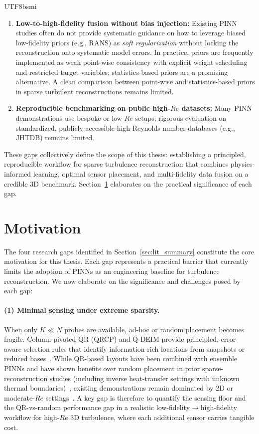 \documentclass[master]{NTHUthesis}
\begin{document}
\begin{CJK*}{UTF8}{bsmi}
\begin{enumerate}
    \item \textbf{Low-to-high-fidelity fusion without bias injection:} Existing PINN studies often do not provide systematic guidance on how to leverage biased low-fidelity priors (e.g., RANS) as \emph{soft regularization} without locking the reconstruction onto systematic model errors. In practice, priors are frequently implemented as weak point-wise consistency with explicit weight scheduling and restricted target variables; statistics-based priors are a promising alternative. A clean comparison between point-wise and statistics-based priors in sparse turbulent reconstructions remains limited.
    
    \item \textbf{Reproducible benchmarking on public high-$Re$ datasets:} Many PINN demonstrations use bespoke or low-$Re$ setups; rigorous evaluation on standardized, publicly accessible high-Reynolds-number databases (e.g., JHTDB) remains limited.
\end{enumerate}

These gaps collectively define the scope of this thesis: establishing a principled, reproducible workflow for sparse turbulence reconstruction that combines physics-informed learning, optimal sensor placement, and multi-fidelity data fusion on a credible 3D benchmark. Section~\ref{sec:motivation} elaborates on the practical significance of each gap.

\section{Motivation}
\label{sec:motivation}
The four research gaps identified in Section~\ref{sec:lit_summary} constitute the core motivation for this thesis. Each gap represents a practical barrier that currently limits the adoption of PINNs as an engineering baseline for turbulence reconstruction. We now elaborate on the significance and challenges posed by each gap:

\paragraph{(1) Minimal sensing under extreme sparsity.}
When only $K\!\ll\!N$ probes are available, ad-hoc or random placement becomes fragile. Column-pivoted QR (QRCP) and Q-DEIM provide principled, error-aware selection rules that identify information-rich locations from snapshots or reduced bases~\cite{Drmac2016SISC, Manohar2018PNAS}. While QR-based layouts have been combined with ensemble PINNs and have shown benefits over random placement in prior sparse-reconstruction studies (including inverse heat-transfer settings with unknown thermal boundaries)~\cite{Soibam2024IJHMT, fluids4020109, bukowski2025sparse}, existing demonstrations remain dominated by 2D or moderate-$Re$ settings~\cite{parfenyev20242dturbulence}. A key gap is therefore to quantify the sensing floor and the QR-vs-random performance gap in a realistic low-fidelity$\to$high-fidelity workflow for high-$Re$ 3D turbulence, where each additional sensor carries tangible cost.


\end{CJK*}
\end{document}
